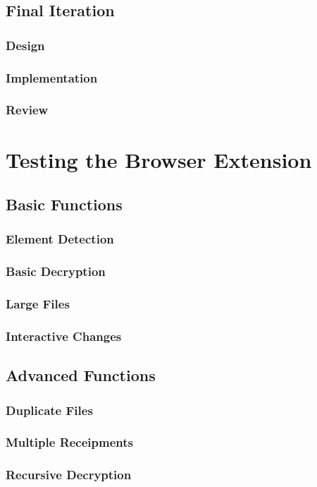 \section{Final Iteration}
\subsection{Design}
\subsection{Implementation}
\subsection{Review}

\chapter{Testing the Browser Extension}
\section{Basic Functions}
\subsection{Element Detection}
\subsection{Basic Decryption}
\subsection{Large Files}
\subsection{Interactive Changes}

\section{Advanced Functions}
\subsection{Duplicate Files}
\subsection{Multiple Receipments}
\subsection{Recursive Decryption}

